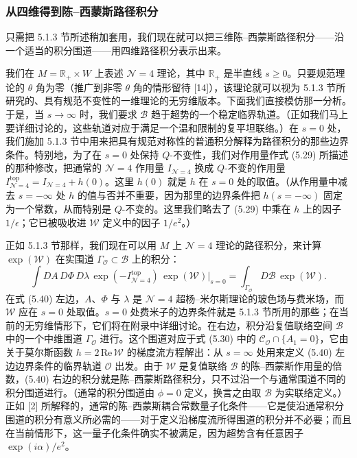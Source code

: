 \documentclass[11pt,a4paper,UTF8]{ctexart}
\theoremstyle{plain}
\theoremstyle{definition}
\begin{document}
\subsubsection{从四维得到陈–西蒙斯路径积分}

只需把 5.1.3 节所述稍加套用，我们现在就可以把三维陈–西蒙斯路径积分——沿一个适当的积分围道——用四维路径积分表示出来。

我们在 $M=\mathbb{R}_+\times W$ 上表述 $\mathcal{N}=4$ 理论，其中 $\mathbb{R}_+$ 是半直线 $s\ge 0$。只要规范理论的 $\theta$ 角为零（推广到非零 $\theta$ 角的情形留待 [14]），该理论就可以视为 5.1.3 节所研究的、具有规范不变性的一维理论的无穷维版本。下面我们直接模仿那一分析。于是，当 $s\to\infty$ 时，我们要求 $\mathcal{B}$ 趋于超势的一个稳定临界轨道。（正如我们马上要详细讨论的，这些轨道对应于满足一个温和限制的复平坦联络。）在 $s=0$ 处，我们施加 5.1.3 节中用来把具有规范对称性的普通积分解释为路径积分的那些边界条件。特别地，为了在 $s=0$ 处保持 $Q$-不变性，我们对作用量作式 (5.29) 所描述的那种修改，把通常的 $\mathcal{N}=4$ 作用量 $I_{\mathcal{N}=4}$ 换成 $Q$-不变的作用量 $I^{\mathrm{top}}_{\mathcal{N}=4}=I_{\mathcal{N}=4}+h(0)$。这里 $h(0)$ 就是 $h$ 在 $s=0$ 处的取值。（从作用量中减去 $s=-\infty$ 处 $h$ 的值与否并不重要，因为那里的边界条件把 $h(s=-\infty)$ 固定为一个常数，从而特别是 $Q$-不变的。这里我们略去了 (5.29) 中乘在 $h$ 上的因子 $1/\epsilon$；它已被吸收进 $\mathcal{W}$ 定义中的因子 $1/e^2$。）

正如 5.1.3 节那样，我们现在可以用 $M$ 上 $\mathcal{N}=4$ 理论的路径积分，来计算 $\exp(\mathcal{W})$ 在实围道 $\Gamma_{\mathcal{O}}\subset\mathcal{B}$ 上的积分：
\begin{equation}
    \int DA\,D\Phi\,D\lambda\,\exp(-I^{\mathrm{top}}_{\mathcal{N}=4})\,\exp(\mathcal{W})|_{s=0}=\int_{\Gamma_{\mathcal{O}}}D\mathcal{B}\,\exp(\mathcal{W}).
    \tag{5.40}
\end{equation}
在式 (5.40) 左边，$A$、$\Phi$ 与 $\lambda$ 是 $\mathcal{N}=4$ 超杨–米尔斯理论的玻色场与费米场，而 $\mathcal{W}$ 应在 $s=0$ 处取值。$s=0$ 处费米子的边界条件就是 5.1.3 节所用的那些；在当前的无穷维情形下，它们将在附录中详细讨论。在右边，积分沿复值联络空间 $\mathcal{B}$ 中的一个中维围道 $\Gamma_{\mathcal{O}}$ 进行。这个围道对应于式 (5.30) 中的 $\mathcal{C}_{\mathcal{O}}\cap\{A_1=0\}$，它由关于莫尔斯函数 $h=2\,\mathrm{Re}\,\mathcal{W}$ 的梯度流方程解出：从 $s=\infty$ 处用来定义 (5.40) 左边边界条件的临界轨道 $\mathcal{O}$ 出发。由于 $\mathcal{W}$ 是复值联络 $\mathcal{B}$ 的陈–西蒙斯作用量的倍数，(5.40) 右边的积分就是陈–西蒙斯路径积分，只不过沿一个与通常围道不同的积分围道进行。（通常的积分围道由 $\phi=0$ 定义，换言之由取 $\mathcal{B}$ 为实联络定义。）正如 [2] 所解释的，通常的陈–西蒙斯耦合常数量子化条件——它是使沿通常积分围道的积分有意义所必需的——对于定义沿梯度流所得围道的积分并不必要；而且在当前情形下，这一量子化条件确实不被满足，因为超势含有任意因子 $\exp(i\alpha)/e^2$。
\end{document}
